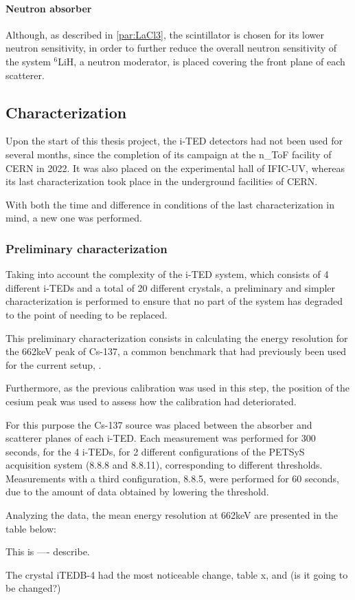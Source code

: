 \paragraph{Neutron absorber}

Although, as described in \autoref{par:LaCl3}, the scintillator is chosen for its lower neutron sensitivity, in order to further reduce the overall neutron sensitivity of the system $^6$LiH, a neutron moderator, is placed covering the front plane of each scatterer.

\subsection{Characterization}

Upon the start of this thesis project, the i-TED detectors had not been used for several months, since the completion of its campaign at the n\_ToF facility of CERN in 2022. It was also placed on the experimental hall of IFIC-UV, whereas its last characterization took place in the underground facilities of CERN.

With both the time and difference in conditions of the last characterization in mind, a new one was performed. 

\subsubsection{Preliminary characterization}

Taking into account the complexity of the i-TED system, which consists of 4 different i-TEDs and a total of 20 different crystals, a preliminary and simpler characterization is performed to ensure that no part of the system has degraded to the point of needing to be replaced.

This preliminary characterization consists in calculating the energy resolution for the 662keV peak of Cs-137, a common benchmark that had previously been used for the current setup, \cite{}.

Furthermore, as the previous calibration was used in this step, the position of the cesium peak was used to assess how the calibration had deteriorated.

For this purpose the Cs-137 source was placed between the absorber and scatterer planes of each i-TED. Each measurement was performed for 300 seconds, for the 4 i-TEDs, for 2 different configurations of the PETSyS acquisition system (8.8.8 and 8.8.11), corresponding to different thresholds. Measurements with a third configuration, 8.8.5, were performed for 60 seconds, due to the amount of data obtained by lowering the threshold.

Analyzing the data, the mean energy resolution at 662keV are presented in the table below:


This is ---- describe.

The crystal iTEDB-4 had the most noticeable change, table x, and (is it going to be changed?)

